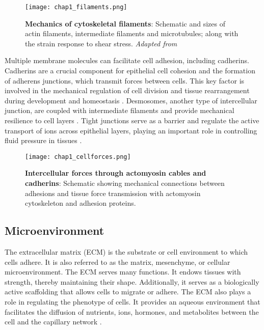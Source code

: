 \begin{figure}[h!]
	\centering
	\texttt{[image: chap1\_filaments.png]}
	\caption{\label{fig_1_3b} \textbf{Mechanics of cytoskeletal filaments}: Schematic and sizes of actin filaments, intermediate filaments and microtubules; along with the strain response to shear stress. \textit{Adapted from \cite{leggett2021}}}
\end{figure}

Multiple membrane molecules can facilitate cell adhesion, including cadherins. Cadherins are a crucial component for epithelial cell cohesion and the formation of adherens junctions, which transmit forces between cells. This key factor is involved in the mechanical regulation of cell division and tissue rearrangement during development and homeostasis \cite{godard2019, mertz2013}. Desmosomes, another type of intercellular junction, are coupled with intermediate filaments and provide mechanical resilience to cell layers \cite{hatzfeld2017, latorre2018}. Tight junctions serve as a barrier and regulate the active transport of ions across epithelial layers, playing an important role in controlling fluid pressure in tissues \cite{marchiando2010, chan2020}.

\begin{figure}[H]
	\centering
	\texttt{[image: chap1\_cellforces.png]}
	\caption{\label{fig_1_3} \textbf{Intercellular forces through actomyosin cables and cadherins}: Schematic showing mechanical connections between adhesions and tissue force transmission with actomyosin cytoskeleton and adhesion proteins. \cite{ladoux2017}}
\end{figure}

\hypertarget{microenvironment}{%
	\subsection{Microenvironment}\label{microenvironment}}

The extracellular matrix (ECM) is the substrate or cell environment to which cells adhere. It is also referred to as the matrix, mesenchyme, or cellular microenvironment. The ECM serves many functions. It endows tissues with strength, thereby maintaining their shape. Additionally, it serves as a biologically active scaffolding that allows cells to migrate or adhere. The ECM also plays a role in regulating the phenotype of cells. It provides an aqueous environment that facilitates the diffusion of nutrients, ions, hormones, and metabolites between the cell and the capillary network \cite{alberts2015}.

